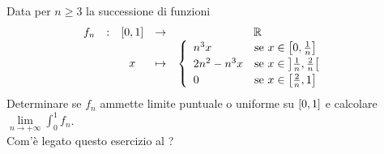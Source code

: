 \begin{exercise}
	Data per $n \geq 3$ la successione di funzioni
	\[
		\begin{array}{ccccc} {f_n} & : & {
			\left[0,1\right]
		} & \to & {\mathbb{R}} \\ & & {x} & \mapsto & {
			\begin{cases}
				\begin{array}{ll}
					n^3 x & \text{se } x \in \left[0,\frac{1}{n}\right]\\
					2n^2 - n^3 x & \text{se } x \in \left]\frac{1}{n},\frac{2}{n}\right[\\
					0 & \text{se } x \in \left[\frac{2}{n},1\right]
				\end{array}
			\end{cases}
		} \\ \end{array}
	\]
	Determinare se $f_n$ ammette limite puntuale o uniforme su $\left[0,1\right]$ e calcolare $\lim\limits_{n \to +\infty} \int_{0}^{1} f_n$.\\
	Com'è legato questo esercizio al ?
\end{exercise}

